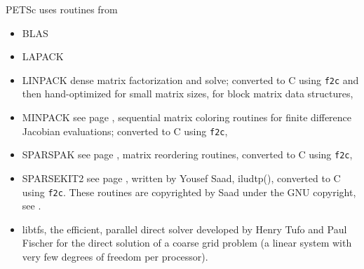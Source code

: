 \vspace{.3in}
\noindent
PETSc uses routines from 
\begin{itemize}
  \item BLAS
  \item LAPACK
  \item LINPACK      dense matrix factorization and solve; converted to C using {\tt f2c} and then 
                      hand-optimized for small matrix sizes, for block matrix data structures,
  \item MINPACK      see page \pageref{sec_fdmatrix}, sequential matrix coloring routines for finite difference Jacobian
                       evaluations; converted to C using {\tt f2c},
  \item SPARSPAK     see page \pageref{sec_factorization}, matrix reordering routines, converted to C using {\tt f2c},
  \item SPARSEKIT2   see page \pageref{sec_ilu_icc}, written by Yousef Saad, iludtp(), converted to C using {\tt f2c}. 
                     These routines 
                     are copyrighted by Saad under the GNU copyright, see .
  \item libtfs, the efficient, parallel direct solver developed by Henry Tufo and Paul Fischer for the direct solution of a coarse grid problem (a linear system with very few degrees of freedom per processor).
\end{itemize}


